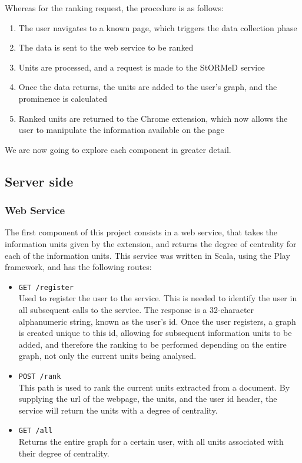 \noindent Whereas for the ranking request, the procedure is as follows:
\begin{enumerate}
\item The user navigates to a known page, which triggers the data collection phase
\item The data is sent to the web service to be ranked
\item Units are processed, and a request is made to the StORMeD service
\item Once the data returns, the units are added to the user's graph, and the prominence is calculated
\item Ranked units are returned to the Chrome extension, which now allows the user to manipulate the information available on the page
\end{enumerate}
We are now going to explore each component in greater detail.


\subsection{Server side}
\subsubsection{Web Service}
The first component of this project consists in a web service, that takes the information units given by the extension, and returns the degree of centrality for each of the information units. This service was written in Scala, using the Play framework, and has the following routes:

\begin{itemize}
\item \texttt{GET /register}\\
Used to register the user to the service. This is needed to identify the user in all subsequent calls to the service. The response is a 32-character alphanumeric string, known as the user's id. Once the user registers, a graph is created unique to this id, allowing for subsequent information units to be added, and therefore the ranking to be performed depending on the entire graph, not only the current units being analysed.
\item \texttt{POST /rank}\\
This path is used to rank the current units extracted from a document. By supplying the url of the webpage, the units, and the user id header, the service will return the units with a degree of centrality. 
\item \texttt{GET /all}\\
Returns the entire graph for a certain user, with all units associated with their degree of centrality.
\end{itemize}



